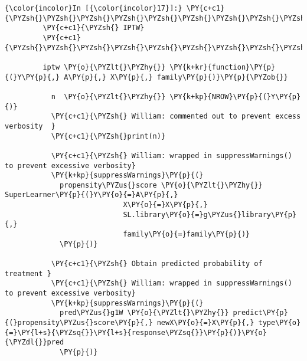    \begin{Verbatim}[commandchars=\\\{\}]
{\color{incolor}In [{\color{incolor}17}]:} \PY{c+c1}{\PYZsh{}\PYZsh{}\PYZsh{}\PYZsh{}\PYZsh{}\PYZsh{}\PYZsh{}\PYZsh{}\PYZsh{}\PYZsh{}\PYZsh{}\PYZsh{}\PYZsh{}\PYZsh{}\PYZsh{}\PYZsh{}\PYZsh{}\PYZsh{}\PYZsh{}\PYZsh{}\PYZsh{}\PYZsh{}\PYZsh{}\PYZsh{}\PYZsh{}\PYZsh{}\PYZsh{}\PYZsh{}\PYZsh{}\PYZsh{}\PYZsh{}\PYZsh{}\PYZsh{}\PYZsh{}\PYZsh{}\PYZsh{}\PYZsh{}\PYZsh{}\PYZsh{}\PYZsh{}\PYZsh{}\PYZsh{}\PYZsh{}\PYZsh{}\PYZsh{}\PYZsh{}\PYZsh{}\PYZsh{}\PYZsh{}\PYZsh{}\PYZsh{}\PYZsh{}\PYZsh{}\PYZsh{}\PYZsh{}\PYZsh{}\PYZsh{}\PYZsh{}\PYZsh{}\PYZsh{}\PYZsh{}}
         \PY{c+c1}{\PYZsh{} IPTW}
         \PY{c+c1}{\PYZsh{}\PYZsh{}\PYZsh{}\PYZsh{}\PYZsh{}\PYZsh{}\PYZsh{}\PYZsh{}\PYZsh{}\PYZsh{}\PYZsh{}\PYZsh{}\PYZsh{}\PYZsh{}\PYZsh{}\PYZsh{}\PYZsh{}\PYZsh{}\PYZsh{}\PYZsh{}\PYZsh{}\PYZsh{}\PYZsh{}\PYZsh{}\PYZsh{}\PYZsh{}\PYZsh{}\PYZsh{}\PYZsh{}\PYZsh{}\PYZsh{}\PYZsh{}\PYZsh{}\PYZsh{}\PYZsh{}\PYZsh{}\PYZsh{}\PYZsh{}\PYZsh{}\PYZsh{}\PYZsh{}\PYZsh{}\PYZsh{}\PYZsh{}\PYZsh{}\PYZsh{}\PYZsh{}\PYZsh{}\PYZsh{}\PYZsh{}\PYZsh{}\PYZsh{}\PYZsh{}\PYZsh{}\PYZsh{}\PYZsh{}\PYZsh{}\PYZsh{}\PYZsh{}\PYZsh{}\PYZsh{}}
         
         iptw \PY{o}{\PYZlt{}\PYZhy{}} \PY{k+kr}{function}\PY{p}{(}Y\PY{p}{,} A\PY{p}{,} X\PY{p}{,} family\PY{p}{)}\PY{p}{\PYZob{}}
             
           n  \PY{o}{\PYZlt{}\PYZhy{}} \PY{k+kp}{NROW}\PY{p}{(}Y\PY{p}{)}
           \PY{c+c1}{\PYZsh{} William: commented out to prevent excess verbosity  }
           \PY{c+c1}{\PYZsh{}print(n)}
             
           \PY{c+c1}{\PYZsh{} William: wrapped in suppressWarnings() to prevent excessive verbosity}
           \PY{k+kp}{suppressWarnings}\PY{p}{(}
             propensity\PYZus{}score \PY{o}{\PYZlt{}\PYZhy{}} SuperLearner\PY{p}{(}Y\PY{o}{=}A\PY{p}{,}
                            X\PY{o}{=}X\PY{p}{,}
                            SL.library\PY{o}{=}g\PYZus{}library\PY{p}{,}
                            family\PY{o}{=}family\PY{p}{)}
             \PY{p}{)} 
             
           \PY{c+c1}{\PYZsh{} Obtain predicted probability of treatment }
           \PY{c+c1}{\PYZsh{} William: wrapped in suppressWarnings() to prevent excessive verbosity}
           \PY{k+kp}{suppressWarnings}\PY{p}{(}
             pred\PYZus{}g1W \PY{o}{\PYZlt{}\PYZhy{}} predict\PY{p}{(}propensity\PYZus{}score\PY{p}{,} newX\PY{o}{=}X\PY{p}{,} type\PY{o}{=}\PY{l+s}{\PYZsq{}}\PY{l+s}{response\PYZsq{}}\PY{p}{)}\PY{o}{\PYZdl{}}pred
             \PY{p}{)} 
             

\end{Verbatim}
